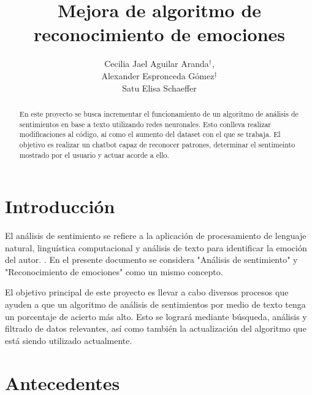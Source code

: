 \documentclass[a4]{sciposter}
\title{Mejora de algoritmo de\\reconocimiento de emociones}
\author{Cecilia Jael Aguilar Aranda$^\dagger$,\\Alexander Espronceda Gómez$^\ddagger$\\Satu Elisa Schaeffer}
\institute {$^\dagger$Ingeniería en Administración de Sistemas,  $^\ddagger$Ingeniería en Tecnologías de Software, Posgrado en Ingeniería de Sistemas}
\begin{document}

\maketitle

\begin{abstract}
En este proyecto se busca incrementar el funcionamiento de un algoritmo de análisis de sentimientos en base a texto utilizando redes neuronales. Esto conlleva realizar modificaciones al código, aí como el aumento del dataset con el que se trabaja. El objetivo es realizar un chatbot capaz de reconocer patrones, determinar el sentimeinto mostrado por el usuario y actuar acorde a ello.
\end{abstract}

\begin{multicols}{2} 

\section{Introducción}
El análisis de sentimiento se refiere a la aplicación de procesamiento de lenguaje natural, linguística computacional y análisis de texto para identificar la emoción del autor. \citep{definition}. En el presente documento se considera "Análisis de sentimiento" y "Reconocimiento de emociones" como un mismo concepto.

El objetivo principal de este proyecto es llevar a cabo diversos procesos que ayuden a que un algoritmo de análisis de sentimientos por medio de texto tenga un porcentaje de acierto más alto. Esto se logrará mediante búsqueda, análisis y filtrado de datos relevantes, así como también la actualización del algoritmo que está siendo utilizado actualmente.

\section{Antecedentes}


\end{multicols}
\end{document}
